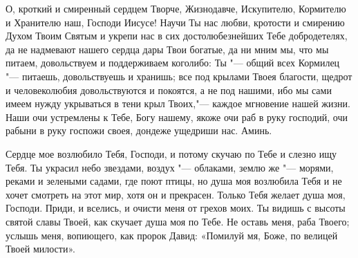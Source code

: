 \mychapterending


\begin{mymulticols}



О, кроткий и смиренный сердцем Творче, Жизнодавче, Искупителю, Кормителю и Хранителю наш, Господи Иисусе! Научи Ты нас любви, кротости и смирению Духом Твоим Святым и укрепи нас в сих достолюбезнейших Тебе добродетелях, да не надмевают нашего сердца дары Твои богатые, да ни мним мы, что мы питаем, довольствуем и поддерживаем коголибо: Ты "--- общий всех Кормилец "--- питаешь, довольствуешь и хранишь; все под крылами Твоея благости, щедрот и человеколюбия довольствуются и покоятся, а не под нашими, ибо мы сами имеем нужду укрываться в тени крыл Твоих,"--- каждое мгновение нашей жизни. Наши очи устремлены к Тебе, Богу нашему, якоже очи раб в руку господий, очи рабыни в руку госпожи своея, дондеже ущедриши нас. Аминь.

\end{mymulticols}

\mychapterending


\begin{mymulticols}



Сердце мое возлюбило Тебя, Господи, и потому скучаю по Тебе и слезно ищу Тебя. Ты украсил небо звездами, воздух "--- облаками, землю же "--- морями, реками и зелеными садами, где поют птицы, но душа моя возлюбила Тебя и не хочет смотреть на этот мир, хотя он и прекрасен. Только Тебя желает душа моя, Господи. Приди, и вселись, и очисти меня от грехов моих. Ты видишь с высоты святой славы Твоей, как скучает душа моя по Тебе. Не оставь меня, раба Твоего; услышь меня, вопиющего, как пророк Давид: «Помилуй мя, Боже, по велицей Твоей милости».

\end{mymulticols}

\mychapterending



